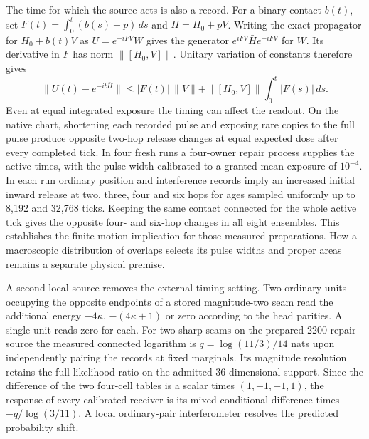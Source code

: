 \documentclass[11pt]{article}
\begin{document}
The time for which the source acts is also a record. For a binary
contact $b(t)$, set $F(t)=\int_0^t(b(s)-p)\,ds$ and
$\bar H=H_0+pV$. Writing the exact propagator for $H_0+b(t)V$ as
$U=e^{-iFV}W$ gives the generator $e^{iFV}\bar H e^{-iFV}$ for
$W$. Its derivative in $F$ has norm $\|[H_0,V]\|$. Unitary variation
of constants therefore gives
\[
 \|U(t)-e^{-it\bar H}\|\le |F(t)|\,\|V\|
       +\|[H_0,V]\|\int_0^t |F(s)|\,ds .
\]
Even at equal integrated exposure the timing can affect the readout.
On the native chart, shortening each recorded pulse and exposing rare
copies to the full pulse produce opposite two-hop release changes
at equal expected dose after every completed tick. In four fresh runs
a four-owner repair process supplies the active times, with the pulse
width calibrated to a granted mean exposure of $10^{-4}$. In each
run ordinary position and interference records imply an increased
initial inward release at two, three, four and six hops for ages
sampled uniformly up to 8,192 and 32,768 ticks. Keeping the same
contact connected for the whole active tick gives the opposite
four- and six-hop changes in all eight ensembles. This establishes the
finite motion implication for those measured preparations. How a
macroscopic distribution of overlaps selects its pulse widths and
proper areas remains a separate physical premise.

A second local source removes the external timing setting. Two ordinary
units occupying the opposite endpoints of a stored magnitude-two seam
read the additional energy $-4\kappa$, $-(4\kappa+1)$ or zero according
to the head parities. A single unit reads zero for each. For two sharp
seams on the prepared 2200 repair source the measured connected
logarithm is $q=\log(11/3)/14$ nats upon independently pairing the
records at fixed marginals. Its magnitude resolution retains the full
likelihood ratio on the admitted 36-dimensional support. Since the
difference of the two four-cell tables is a scalar times
$(1,-1,-1,1)$, the response of every calibrated receiver is its
mixed conditional difference times $-q/\log(3/11)$. A local
ordinary-pair interferometer resolves the predicted probability shift.
\end{document}
